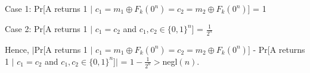 \documentclass[12pt]{article}
\begin{document}
Case 1: Pr[A returns 1 $|$ $c_1 = m_1 \oplus F_{k}(0^n) = c_2 = m_2 \oplus F_{k}(0^n)$] = 1

Case 2: Pr[A returns 1 $|$ $c_1 = c_2$ and $c_1,c_2 \in \{0,1\}^{n}$] = $\frac{1}{2^n}$

\noindent Hence, $|$Pr[A returns 1 $|$ $c_1 = m_1 \oplus F_{k}(0^n) = c_2 = m_2 \oplus F_{k}(0^n)$] - Pr[A returns 1 $|$ $c_1 = c_2$ and $c_1,c_2 \in \{0,1\}^{n}$]$|$ = $1-\frac{1}{2^n} > $negl$(n)$.
\end{document}
